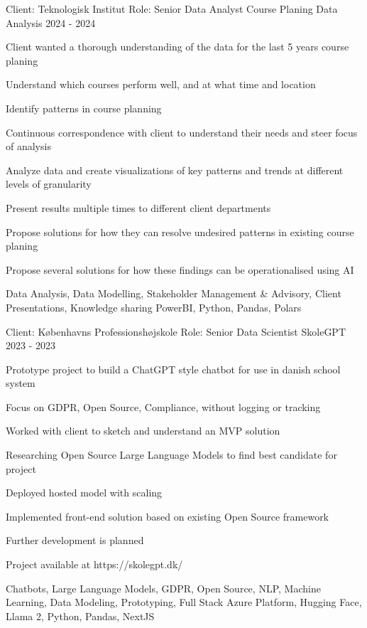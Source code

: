 \begin{cventries}
\cventry
{Client: Teknologisk Institut \newline Role: Senior Data Analyst} %
{Course Planing Data Analysis} %
{}%
{2024 - 2024} %
{ %
\begin{cvitems}
\item {Client wanted a thorough understanding of the data for the last 5 years course planing}
\item {Understand which courses perform well, and at what time and location}
\item {Identify patterns in course planning}
\item {Continuous correspondence with client to understand their needs and steer focus of analysis}
\item {Analyze data and create visualizations of key patterns and trends at different levels of granularity}
\item {Present results multiple times to different client departments}
\item {Propose solutions for how they can resolve undesired patterns in existing course planing}
\item {Propose several solutions for how these findings can be operationalised using AI}
\end{cvitems}
\cventrykeywords
{Data Analysis, Data Modelling, Stakeholder Management \& Advisory, Client Presentations, Knowledge sharing}
{PowerBI, Python, Pandas, Polars}
}

\cventry
{Client: Københavns Professionshøjskole \newline Role: Senior Data Scientist} %
{SkoleGPT} %
{}%
{2023 - 2023} %
{ %
\begin{cvitems}
\item {Prototype project to build a ChatGPT style chatbot for use in danish school system}
\item {Focus on GDPR, Open Source, Compliance, without logging or tracking}
\item {Worked with client to sketch and understand an MVP solution}
\item {Researching Open Source Large Language Models to find best candidate for project}
\item {Deployed hosted model with scaling}
\item {Implemented front-end solution based on existing Open Source framework}
\item {Further development is planned}
\item {Project available at https://skolegpt.dk/}
\end{cvitems}
\cventrykeywords
{Chatbots, Large Language Models, GDPR, Open Source, NLP, Machine Learning, Data Modeling, Prototyping, Full Stack}
{Azure Platform, Hugging Face, Llama 2, Python, Pandas, NextJS}
}


\end{cventries}
